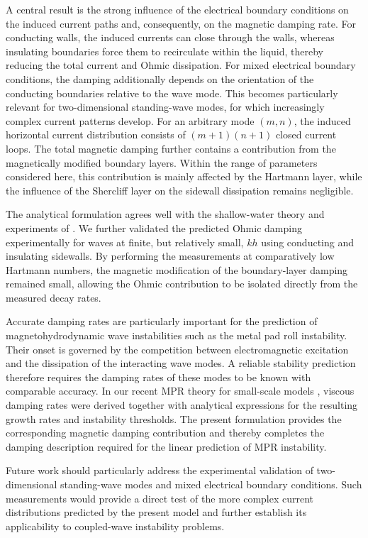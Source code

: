\documentclass[aps,prfluids,reprint,superscriptaddress]{revtex4-2}
\begin{document}
A central result is the strong influence of the electrical boundary conditions on the induced current paths and, consequently, on the magnetic damping rate. For conducting walls, the induced currents can close through the walls, whereas insulating boundaries force them to recirculate within the liquid, thereby reducing the total current and Ohmic dissipation. For mixed electrical boundary conditions, the damping additionally depends on the orientation of the conducting boundaries relative to the wave mode. This becomes particularly relevant for two-dimensional standing-wave modes, for which increasingly complex current patterns develop. For an arbitrary mode $(m,n)$, the induced horizontal current distribution consists of $(m+1)(n+1)$ closed current loops. The total magnetic damping further contains a contribution from the magnetically modified boundary layers. Within the range of parameters considered here, this contribution is mainly affected by the Hartmann layer, while the influence of the Shercliff layer on the sidewall dissipation remains negligible.

The analytical formulation agrees well with the shallow-water theory and experiments of \citet{Sreenivasan2005}. We further validated the predicted Ohmic damping experimentally for waves at finite, but relatively small, $kh$ using conducting and insulating sidewalls. By performing the measurements at comparatively low Hartmann numbers, the magnetic modification of the boundary-layer damping remained small, allowing the Ohmic contribution to be isolated directly from the measured decay rates.

Accurate damping rates are particularly important for the prediction of magnetohydrodynamic wave instabilities such as the metal pad roll instability. Their onset is governed by the competition between electromagnetic excitation and the dissipation of the interacting wave modes. A reliable stability prediction therefore requires the damping rates of these modes to be known with comparable accuracy. In our recent MPR theory for small-scale models \cite{Hegde2026}, viscous damping rates were derived together with analytical expressions for the resulting growth rates and instability thresholds. The present formulation provides the corresponding magnetic damping contribution and thereby completes the damping description required for the linear prediction of MPR instability.

Future work should particularly address the experimental validation of two-dimensional standing-wave modes and mixed electrical boundary conditions. Such measurements would provide a direct test of the more complex current distributions predicted by the present model and further establish its applicability to coupled-wave instability problems.
\end{document}

